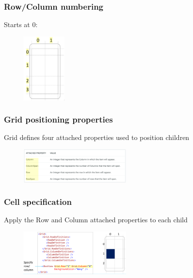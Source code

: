 \documentclass{article}
\begin{document}
\subsubsection{Row/Column numbering}

Starts at 0:

\begin{figure}[H]
    \centering
    \includegraphics[width=0.2\textwidth]{xaml-grid-numbering.png}
    \caption{}
\end{figure}

\subsubsection{Grid positioning properties}

Grid defines four attached properties used to position children

\begin{figure}[H]
    \centering
    \includegraphics[width=0.5\textwidth]{xaml-grid-pos-props.png}
    \caption{}
\end{figure}

\subsubsection{Cell specification}

Apply the Row and Column attached properties to each child

\begin{figure}[H]
    \centering
    \includegraphics[width=0.5\textwidth]{xaml-grid-cells.png}
    \caption{}
\end{figure}
\end{document}
